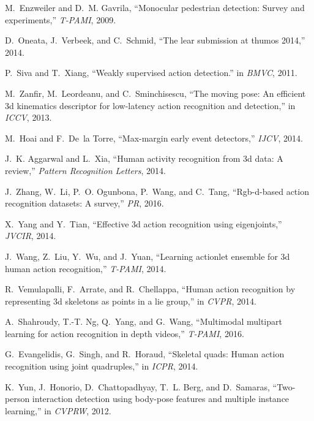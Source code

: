 \documentclass[10pt,twocolumn,letterpaper]{article}
\begin{document}
\begin{thebibliography}{10}
   M.~Enzweiler and D.~M. Gavrila, ``Monocular pedestrian detection: Survey and
     experiments,'' \emph{T-PAMI}, 2009.
   
   D.~Oneata, J.~Verbeek, and C.~Schmid, ``The lear submission at thumos 2014,''
     2014.
   
   P.~Siva and T.~Xiang, ``Weakly supervised action detection.'' in \emph{BMVC},
     2011.
   
   M.~Zanfir, M.~Leordeanu, and C.~Sminchisescu, ``The moving pose: An efficient
     3d kinematics descriptor for low-latency action recognition and detection,''
     in \emph{ICCV}, 2013.
   
   M.~Hoai and F.~De~la Torre, ``Max-margin early event detectors,'' \emph{IJCV},
     2014.
   
   J.~K. Aggarwal and L.~Xia, ``Human activity recognition from 3d data: A
     review,'' \emph{Pattern Recognition Letters}, 2014.
   
   J.~Zhang, W.~Li, P.~O. Ogunbona, P.~Wang, and C.~Tang, ``Rgb-d-based action
     recognition datasets: A survey,'' \emph{PR}, 2016.
   
   X.~Yang and Y.~Tian, ``Effective 3d action recognition using eigenjoints,''
     \emph{JVCIR}, 2014.
   
   J.~Wang, Z.~Liu, Y.~Wu, and J.~Yuan, ``Learning actionlet ensemble for 3d human
     action recognition,'' \emph{T-PAMI}, 2014.
   
   R.~Vemulapalli, F.~Arrate, and R.~Chellappa, ``Human action recognition by
     representing 3d skeletons as points in a lie group,'' in \emph{CVPR}, 2014.
   
   A.~Shahroudy, T.-T. Ng, Q.~Yang, and G.~Wang, ``Multimodal multipart learning
     for action recognition in depth videos,'' \emph{T-PAMI}, 2016.
   
   G.~Evangelidis, G.~Singh, and R.~Horaud, ``Skeletal quads: Human action
     recognition using joint quadruples,'' in \emph{ICPR}, 2014.
   
   K.~Yun, J.~Honorio, D.~Chattopadhyay, T.~L. Berg, and D.~Samaras, ``Two-person
     interaction detection using body-pose features and multiple instance
     learning,'' in \emph{CVPRW}, 2012.
   

\end{thebibliography}
\end{document}
